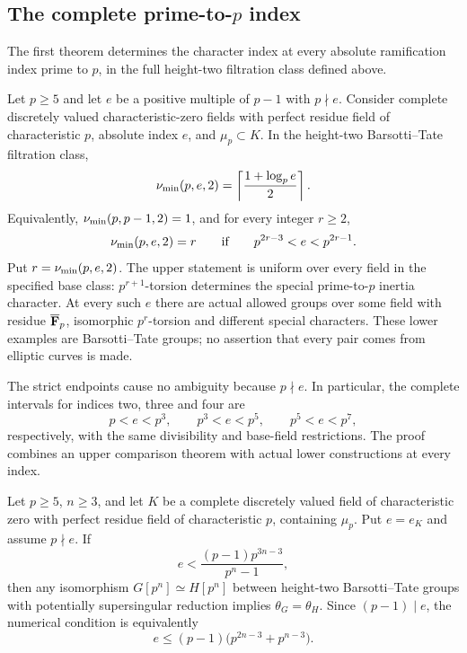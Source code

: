 \subsection{The complete prime-to-$p$ index}
The first theorem determines the character index at every absolute ramification index prime to $p$, in the full height-two filtration class defined above.

\begin{theorem}\label{thm:complete-prime-index}
Let $p\ge5$ and let $e$ be a positive multiple of $p-1$ with $p\nmid e$. Consider complete discretely valued characteristic-zero fields with perfect residue field of characteristic $p$, absolute index $e$, and $\mu_p\subset K$. In the height-two Barsotti--Tate filtration class,
\begin{equation}\label{eq:complete-prime-index}
 \nu_{\min}(p,e,2)=\left\lceil\frac{1+\log_p e}{2}\right\rceil.
\end{equation}
Equivalently, $\nu_{\min}(p,p-1,2)=1$, and for every integer $r\ge2$,
\[
 \nu_{\min}(p,e,2)=r\qquad\text{if}\qquad p^{2r-3}<e<p^{2r-1}.
\]
Put $r=\nu_{\min}(p,e,2)$. The upper statement is uniform over every field in the specified base class: $p^{r+1}$-torsion determines the special prime-to-$p$ inertia character. At every such $e$ there are actual allowed groups over some field with residue $\overline{\mathbf F}_p$, isomorphic $p^r$-torsion and different special characters. These lower examples are Barsotti--Tate groups; no assertion that every pair comes from elliptic curves is made.
\end{theorem}

The strict endpoints cause no ambiguity because $p\nmid e$. In particular, the complete intervals for indices two, three and four are
\[
 p<e<p^3,\qquad p^3<e<p^5,\qquad p^5<e<p^7,
\]
respectively, with the same divisibility and base-field restrictions. The proof combines an upper comparison theorem with actual lower constructions at every index.

\begin{theorem}\label{thm:ss-iterated-range}
Let $p\ge5$, $n\ge3$, and let $K$ be a complete discretely valued field of characteristic zero with perfect residue field of characteristic $p$, containing $\mu_p$. Put $e=e_K$ and assume $p\nmid e$. If
\begin{equation}\label{eq:ss-iterated-range}
 e<\frac{(p-1)p^{3n-3}}{p^n-1},
\end{equation}
then any isomorphism $G[p^n]\simeq H[p^n]$ between height-two Barsotti--Tate groups with potentially supersingular reduction implies $\theta_G=\theta_H$. Since $(p-1)\mid e$, the numerical condition is equivalently
\[
 e\le(p-1)\bigl(p^{2n-3}+p^{n-3}\bigr).
\]
\end{theorem}

